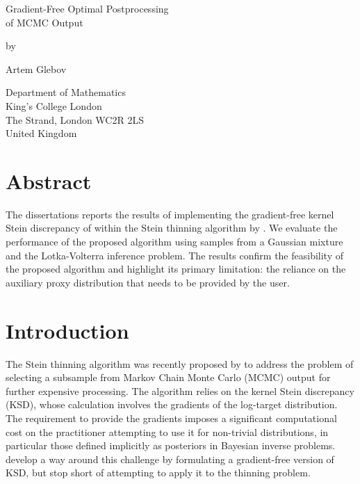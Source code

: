 \documentclass[11pt,a4paper]{report}
\date{}
\begin{document}
%


\thispagestyle{empty}
\begin{center}
{\huge
Gradient-Free Optimal Postprocessing \\
of MCMC Output

\bigskip
\bigskip

by
\bigskip
\bigskip

Artem Glebov
}
\end{center}
\vfill

\begin{center}
{\large
Department of Mathematics\\
King's College London\\
The Strand, London WC2R 2LS\\
United Kingdom\\
\medskip

}
\end{center}
\bigskip


\newpage
\setcounter{page}{1}
\restoregeometry

\chapter*{Abstract}

The dissertations reports the results of implementing the gradient-free kernel Stein discrepancy of \cite{fisherGradientFreeKernelStein2024} within the Stein thinning algorithm by \cite{riabizOptimalThinningMCMC2022}. We evaluate the performance of the proposed algorithm using samples from a Gaussian mixture and the Lotka-Volterra inference problem. The results confirm the feasibility of the proposed algorithm and highlight its primary limitation: the reliance on the auxiliary proxy distribution that needs to be provided by the user.


\tableofcontents


\chapter*{Introduction}

The Stein thinning algorithm was recently proposed by \cite{riabizOptimalThinningMCMC2022} to address the problem of selecting a subsample from Markov Chain Monte Carlo (MCMC) output for further expensive processing. The algorithm relies on the kernel Stein discrepancy (KSD), whose calculation involves the gradients of the log-target distribution. The requirement to provide the gradients imposes a significant computational cost on the practitioner attempting to use it for non-trivial distributions, in particular those defined implicitly as posteriors in Bayesian inverse problems. \cite{fisherGradientFreeKernelStein2024} develop a way around this challenge by formulating a gradient-free version of KSD, but stop short of attempting to apply it to the thinning problem.
\end{document}
